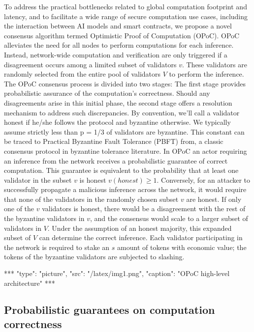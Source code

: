 \documentclass{article}
\begin{document}
To address the practical bottlenecks related to global computation footprint and latency, and to facilitate a wide range of secure computation use cases, including the interaction between AI models and smart contracts, we propose a novel consensus algorithm termed Optimistic Proof of Computation (OPoC).
OPoC alleviates the need for all nodes to perform computations for each inference. Instead, network-wide computation and verification are only triggered if a disagreement occurs among a limited subset of validators \( v \). These validators are randomly selected from the entire pool of validators \( V \) to perform the inference. The OPoC consensus process is divided into two stages: The first stage provides probabilistic assurance of the computation's correctness. Should any disagreements arise in this initial phase, the second stage offers a resolution mechanism to address such discrepancies.
By convention, we’ll call a validator honest if he/she follows the protocol and byzantine otherwise. We typically assume strictly less than p = 1/3 of validators are byzantine. This constant can be traced to Practical Byzantine Fault Tolerance (PBFT) from, a classic consensus protocol in byzantine tolerance literature.
In OPoC an actor requiring an inference from the network receives a probabilistic guarantee of correct computation. This guarantee is equivalent to the probability that at least one validator in the subset \( v \) is honest \( v(honest) \geq 1 \). Conversely, for an attacker to successfully propagate a malicious inference across the network, it would require that none of the validators in the randomly chosen subset \( v \) are honest. If only one of the \( v \) validators is honest, there would be a disagreement with the rest of the byzantine validators in \( v \),  and the consensus would scale to a larger subset of validators in \( V \). Under the assumption of an honest majority, this expanded subset of \( V \) can determine the correct inference. Each validator participating in the network is required to stake an \( s \) amount of tokens with economic value; the tokens of the byzantine validators are subjected to slashing.

***
"type": "picture",
"src": "/latex/img1.png",
"caption": "OPoC high-level architecture"
***

\subsection{Probabilistic guarantees on computation correctness}
\end{document}
